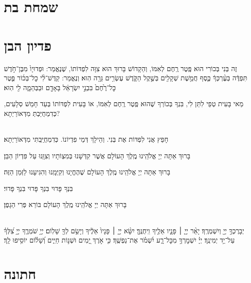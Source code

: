 \documentclass[twoside, openany, parskip=half, 11pt]{book}
\begin{document}
\chapter[שמחת בת]{ שמחת בת }

\chapter[פדיון הבן]{ פדיון הבן }


זֶה בְּנִי בְּכוֹרִי הוּא פֶּֽטֶר רֶֽחֶם לְאִמּוֹ, וְהַקָדוֹשׁ בָּרוּךְ הוּא צִוָּה לִפְדּוֹתוֹ, שֶׁנֶאֱמַר:
וּפְדוּיָו֙ מִבֶּן־חֹ֣דֶשׁ תִּפְדֶּ֔ה בְּעֶ֨רְכְּךָ֔ כֶּ֛סֶף חֲמֵ֥שֶׁת שְׁקָלִ֖ים בְּשֶׁ֣קֶל הַקֹּ֑דֶשׁ עֶשְׂרִ֥ים גֵּרָ֖ה הֽוּא׃
וְנֶאֱמַר:
קַדֶּשׁ־לִ֨י כׇל־בְּכ֜וֹר פֶּ֤טֶר כׇּל־רֶ֙חֶם֙ בִּבְנֵ֣י יִשְׂרָאֵ֔ל בָּאָדָ֖ם וּבַבְּהֵמָ֑ה לִ֖י הֽוּא׃

מַאי בָּעִית טְפֵי לִתֵּן לִי, בִּנְךָ בְּכוֹרְךָ שֶׁהוּא פֶּֽטֶר רֶֽחֶם לְאִמּוֹ, אוֹ בָּעִית לִפְדּוֹתוֹ בְּעַד חָמֵשׁ סְלָעִים, כְּדִמְחֻיַּבְתְּ מִדְּאוֹרַיְתָא?

\\
חָפֵץ אֲנִי לִפְדּוֹת אֶת בְּנִי. וְהֵילָךְ דְּמֵי פִדְיוֹנוֹ. כְּדִמְחֻיַּֽבְתִּי מִדְּאוֹרַיְתָא׃

בָּרוּךְ אַתָּה יְיָ אֱלֹהֵֽינוּ מֶֽלֶךְ הָעוֹלָם אֲשֶׁר קִדְּשָׁנוּ בְּמִצְוֹתָיו וְצִוָּֽנוּ עַל פִּדְיוֹן הַבֵּן׃

בָּרוּךְ אַתָּה יְיָ אֱלֹהֵֽינוּ מֶֽלֶךְ הָעוֹלָם שֶׁהֶחֱיָנוּ וְקִיְּמָֽנוּ וְהִגִּיעָנוּ לַזְּמַן הַזֶּה׃


בִּנְךָ פָּדוּי בִּנְךָ פָּדוּי בִּנְךָ פָּדוּי׃

בָּרוּךְ אַתָּה יְיָ אֱלֹהֵֽינוּ מֶֽלֶךְ הָעוֹלָם בּוֹרֵא פְּרִי הַגָפֶן׃

\\
%
יְבָרֶכְךָ֥ יְיָ֖ וְיִשְׁמְרֶֽךָ׃ יָאֵ֨ר יְיָ֧ ׀ פָּנָ֛יו אֵלֶ֖יךָ וִֽיחֻנֶּֽךָּ׃ יִשָּׂ֨א יְיָ֤ ׀ פָּנָיו֙ אֵלֶ֔יךָ וְיָשֵׂ֥ם לְךָ֖ שָׁלֽוֹם׃
יְיָ֥ שֹׁמְרֶ֑ךָ יְיָ֥ צִ֝לְּךָ֗ עַל־יַ֥ד יְמִינֶֽךָ׃
יְיָ֗ יִשְׁמׇרְךָ֥ מִכׇּל־רָ֑ע יִ֝שְׁמֹ֗ר אֶת־נַפְשֶֽׁךָ׃
כִּ֤י אֹ֣רֶךְ יָ֭מִים וּשְׁנ֣וֹת חַיִּ֑ים וְ֝שָׁל֗וֹם יוֹסִ֥יפוּ לָֽךְ׃

\chapter[חתונה]{ חתונה }
\end{document}
